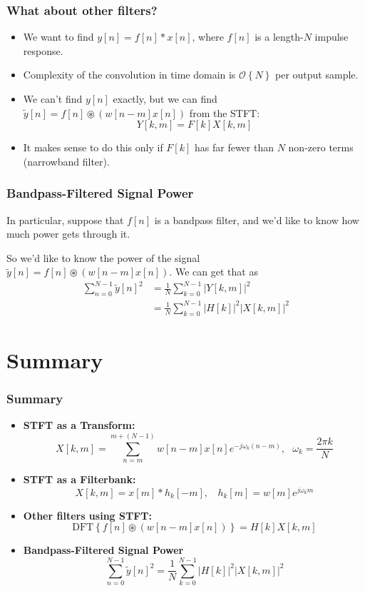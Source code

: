 \documentclass{beamer}
\begin{document}
\begin{frame}
  \frametitle{What about other filters?}

  \begin{itemize}
    \item 
      We want to find $y[n]=f[n]\ast x[n]$, where
      $f[n]$ is a length-$N$ impulse response.
    \item Complexity of the convolution in time domain is
      ${\mathcal{O}}\left\{N\right\}$ per output sample.
    \item We can't find $y[n]$ exactly, but we can find
      $\tilde{y}[n]=f[n]\circledast (w[n-m]x[n])$ from the STFT:
      \[
      Y[k,m] = F[k]X[k,m]
      \]
    \item It makes sense to do this only if $F[k]$ has far fewer than
      $N$ non-zero terms (narrowband filter).
  \end{itemize}
\end{frame}

\begin{frame}
  \frametitle{Bandpass-Filtered Signal Power}

  In particular, suppose that $f[n]$ is a bandpass filter, and we'd
  like to know how much power gets through it.

  So we'd like to know the power of the signal
  $\tilde{y}[n]=f[n]\circledast (w[n-m]x[n])$.  We can get that as
  \begin{align*}
    \sum_{n=0}^{N-1} \tilde{y}[n]^2 
    &= \frac{1}{N}\sum_{k=0}^{N-1} |Y[k,m]|^2\\
    &= \frac{1}{N}\sum_{k=0}^{N-1} |H[k]|^2 |X[k,m]|^2
  \end{align*}
\end{frame}

\section[Summary]{Summary}
\setcounter{subsection}{1}

\begin{frame}
  \frametitle{Summary}
  \begin{itemize}
  \item {\bf STFT as a Transform:}
    \[
    X[k,m]= \sum_{n=m}^{m+(N-1)} w[n-m]x[n]e^{-j\omega_k (n-m)},~~~\omega_k=\frac{2\pi k}{N}
    \]
  \item {\bf STFT as a Filterbank:}
    \[
    X[k,m] = x[m] \ast h_k[-m],~~~~h_k[m] = w[m]e^{j\omega_k m}
    \]
  \item {\bf Other filters using STFT:}
    \[
    \mbox{DFT}\left\{f[n] \circledast (w[n-m]x[n])\right\} = H[k]X[k,m]
    \]
  \item {\bf Bandpass-Filtered Signal Power}
    \[
    \sum_{n=0}^{N-1} \tilde{y}[n]^2 
    = \frac{1}{N}\sum_{k=0}^{N-1} |H[k]|^2 |X[k,m]|^2
    \]
  \end{itemize}
\end{frame}  
\end{document}
